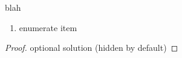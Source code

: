 \documentclass[11pt,a4paper,english]{article}
\begin{document}
\maketitle
\begin{exercise}
  blah
  \begin{enumerate}
    \item enumerate item
  \end{enumerate}
\end{exercise}
\begin{proof}
  optional solution (hidden by default)
\end{proof}
\end{document}
